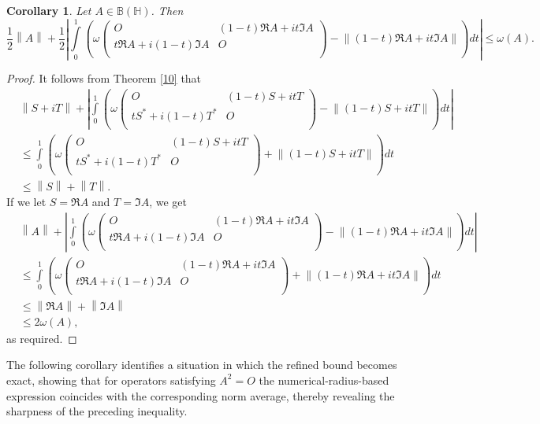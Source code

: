 \documentclass[12pt,twoside,reqno]{amsart}
\newtheorem{corollary}{Corollary}[section]
\numberwithin{equation}{section}
\begin{document}
\begin{corollary}\label{11}
Let $A\in \mathbb B\left( \mathbb H \right)$. Then
{\small
\[\frac{1}{2}\left\| A \right\|+\frac{1}{2}\left| \int\limits_{0}^{1}{\left( \omega \left( \begin{matrix}
   O & \left( 1-t \right)\Re A+it\Im A  \\
   t\Re A+i\left( 1-t \right){\Im A} & O  \\
\end{matrix} \right)-\left\| \left( 1-t \right)\Re A+it\Im A \right\| \right)dt} \right|\le \omega \left( A \right).\]
}
\end{corollary}
\begin{proof}
It follows from Theorem \ref{10} that
\[\begin{aligned}
  & \left\| S+iT \right\|+\left| \int\limits_{0}^{1}{\left( \omega \left( \begin{matrix}
   O & \left( 1-t \right)S+itT  \\
   t{{S}^{*}}+i\left( 1-t \right){{T}^{*}} & O  \\
\end{matrix} \right)-\left\| \left( 1-t \right)S+itT \right\| \right)dt} \right| \\ 
 & \le \int\limits_{0}^{1}{\left( \omega \left( \begin{matrix}
   O & \left( 1-t \right)S+itT  \\
   t{{S}^{*}}+i\left( 1-t \right){{T}^{*}} & O  \\
\end{matrix} \right)+\left\| \left( 1-t \right)S+itT \right\| \right)dt} \\ 
 & \le \left\| S \right\|+\left\| T \right\|. 
\end{aligned}\]
If we let $S=\Re A$ and $T=\Im A$, we get
\[\begin{aligned}
  & \left\| A \right\|+\left| \int\limits_{0}^{1}{\left( \omega \left( \begin{matrix}
   O & \left( 1-t \right)\Re A+it\Im A  \\
   t\Re A+i\left( 1-t \right){\Im A} & O  \\
\end{matrix} \right)-\left\| \left( 1-t \right)\Re A+it\Im A \right\| \right)dt} \right| \\ 
 & \le \int\limits_{0}^{1}{\left( \omega \left( \begin{matrix}
   O & \left( 1-t \right)\Re A+it\Im A  \\
   t\Re A+i\left( 1-t \right)\Im A & O  \\
\end{matrix} \right)+\left\| \left( 1-t \right)\Re A+it\Im A \right\| \right)dt} \\ 
 & \le \left\| \Re A \right\|+\left\| \Im A \right\| \\ 
 & \le 2\omega \left( A \right), 
\end{aligned}\]
as required.
\end{proof}
The following corollary identifies a situation in which the refined bound becomes exact, showing that for operators satisfying $A^{2}=O$ the numerical-radius-based expression coincides with the corresponding norm average, thereby revealing the sharpness of the preceding inequality.
\end{document}
